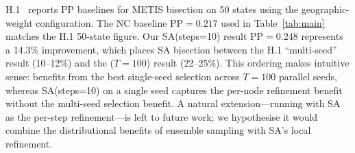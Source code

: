 H.1~\citep{h1paper} reports PP baselines for METIS bisection on 50 states
using the geographic-weight configuration.
The NC baseline PP$= 0.217$ used in Table~\ref{tab:main} matches the H.1
50-state figure.
Our SA(steps=10) result PP$= 0.248$ represents a 14.3\% improvement, which
places SA bisection between the H.1 ``multi-seed'' result (10--12\%)
and the \be{}($T=100$) result (22--25\%).
This ordering makes intuitive sense: \be{} benefits from the best
single-seed selection across $T=100$ parallel seeds, whereas SA(steps=10)
on a single seed captures the per-node refinement benefit without the
multi-seed selection benefit.
A natural extension---running \be{} with SA as the per-step refinement---is
left to future work; we hypothesise it would combine the distributional
benefits of ensemble sampling with SA's local refinement.
